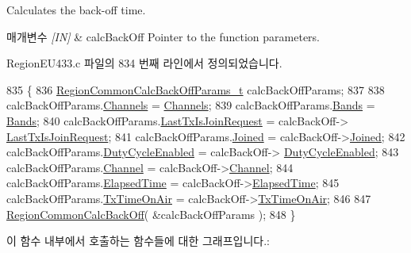 Calculates the back-\/off time. 


\begin{DoxyParams}{매개변수}
{\em \mbox{[}\+I\+N\mbox{]}} & calc\+Back\+Off Pointer to the function parameters. \\
\hline
\end{DoxyParams}


Region\+E\+U433.\+c 파일의 834 번째 라인에서 정의되었습니다.


\begin{DoxyCode}
835 \{
836     \mbox{\hyperlink{structs_region_common_calc_back_off_params}{RegionCommonCalcBackOffParams\_t}} calcBackOffParams;
837 
838     calcBackOffParams.\mbox{\hyperlink{structs_region_common_calc_back_off_params_afecbd1e457cbd79eb7072bd140ff33d4}{Channels}} = \mbox{\hyperlink{_region_e_u433_8c_a989ac3355f1ed5b534b3940af3deeb14}{Channels}};
839     calcBackOffParams.\mbox{\hyperlink{structs_region_common_calc_back_off_params_a18afce97f43b46e9d294e5babbb15f15}{Bands}} = \mbox{\hyperlink{_region_e_u433_8c_a6c5b6e34893684b2def82b051e03096b}{Bands}};
840     calcBackOffParams.\mbox{\hyperlink{structs_region_common_calc_back_off_params_a4088d0ca2ff21fd5cdc110e14816dd53}{LastTxIsJoinRequest}} = calcBackOff->
      \mbox{\hyperlink{structs_calc_back_off_params_a4088d0ca2ff21fd5cdc110e14816dd53}{LastTxIsJoinRequest}};
841     calcBackOffParams.\mbox{\hyperlink{structs_region_common_calc_back_off_params_ac2f6caa0f3b02d2ac5056c3ee7c22652}{Joined}} = calcBackOff->\mbox{\hyperlink{structs_calc_back_off_params_ac2f6caa0f3b02d2ac5056c3ee7c22652}{Joined}};
842     calcBackOffParams.\mbox{\hyperlink{structs_region_common_calc_back_off_params_a4d755868e0e80089462286c3ba6a6f18}{DutyCycleEnabled}} = calcBackOff->
      \mbox{\hyperlink{structs_calc_back_off_params_a4d755868e0e80089462286c3ba6a6f18}{DutyCycleEnabled}};
843     calcBackOffParams.\mbox{\hyperlink{structs_region_common_calc_back_off_params_a1ca6f01ca18afe402de51babe8c95f5e}{Channel}} = calcBackOff->\mbox{\hyperlink{structs_calc_back_off_params_a1ca6f01ca18afe402de51babe8c95f5e}{Channel}};
844     calcBackOffParams.\mbox{\hyperlink{structs_region_common_calc_back_off_params_a2ece30988e7a5bac284623173173c71a}{ElapsedTime}} = calcBackOff->\mbox{\hyperlink{structs_calc_back_off_params_a2ece30988e7a5bac284623173173c71a}{ElapsedTime}};
845     calcBackOffParams.\mbox{\hyperlink{structs_region_common_calc_back_off_params_aa17a8607485db100d315e74853dd217e}{TxTimeOnAir}} = calcBackOff->\mbox{\hyperlink{structs_calc_back_off_params_aa17a8607485db100d315e74853dd217e}{TxTimeOnAir}};
846 
847     \mbox{\hyperlink{group___r_e_g_i_o_n_c_o_m_m_o_n_gae2b1dfba27c79f605048f2d9869dc57d}{RegionCommonCalcBackOff}}( &calcBackOffParams );
848 \}
\end{DoxyCode}
이 함수 내부에서 호출하는 함수들에 대한 그래프입니다.\+:
\mbox{\label{group___r_e_g_i_o_n_e_u433_ga9f5e0e0881857bae99067d739c037882}} 

